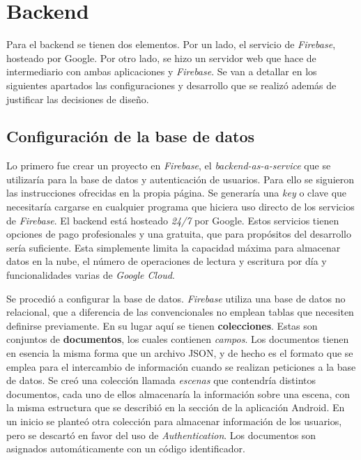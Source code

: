 \section{Backend}

Para el backend se tienen dos elementos. Por un lado, el servicio de \textit{Firebase}, hosteado por Google. Por otro lado, se hizo un servidor web que hace de intermediario con ambas aplicaciones y \textit{Firebase}. Se van a detallar en los siguientes apartados las configuraciones y desarrollo que se realizó además de justificar las decisiones de diseño.

\subsection{Configuración de la base de datos}

Lo primero fue crear un proyecto en \textit{Firebase}, el \textit{backend-as-a-service} que se utilizaría para la base de datos y autenticación de usuarios. Para ello se siguieron las instrucciones ofrecidas en la propia página. Se generaría una \textit{key} o clave que necesitaría cargarse en cualquier programa que hiciera uso directo de los servicios de \textit{Firebase}. El backend está hosteado \textit{24/7} por Google. Estos servicios tienen opciones de pago profesionales y una gratuita, que para propósitos del desarrollo sería suficiente. Esta simplemente limita la capacidad máxima para almacenar datos en la nube, el número de operaciones de lectura y escritura por día y funcionalidades varias de \textit{Google Cloud}.

Se procedió a configurar la base de datos. \textit{Firebase} utiliza una base de datos no relacional, que a diferencia de las convencionales no emplean tablas que necesiten definirse previamente. En su lugar aquí se tienen \textbf{colecciones}. Estas son conjuntos de \textbf{documentos}, los cuales contienen \textit{campos}. Los documentos tienen en esencia la misma forma que un archivo JSON, y de hecho es el formato que se emplea para el intercambio de información cuando se realizan peticiones a la base de datos. Se creó una colección llamada \textit{escenas} que contendría distintos documentos, cada uno de ellos almacenaría la información sobre una escena, con la misma estructura que se describió en la sección de la aplicación Android. En un inicio se planteó otra colección para almacenar información de los usuarios, pero se descartó en favor del uso de \textit{Authentication}. Los documentos son asignados automáticamente con un código identificador.

